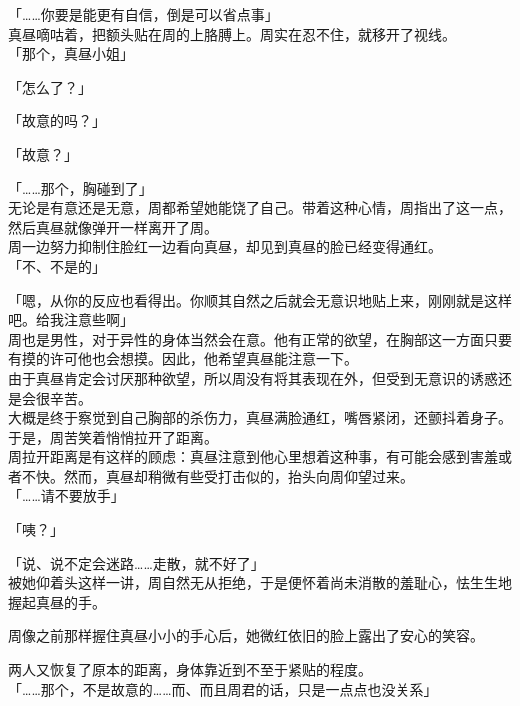 「……你要是能更有自信，倒是可以省点事」\\

真昼嘀咕着，把额头贴在周的上胳膊上。周实在忍不住，就移开了视线。\\

「那个，真昼小姐」

「怎么了？」

「故意的吗？」

「故意？」

「……那个，胸碰到了」\\

无论是有意还是无意，周都希望她能饶了自己。带着这种心情，周指出了这一点，然后真昼就像弹开一样离开了周。\\

周一边努力抑制住脸红一边看向真昼，却见到真昼的脸已经变得通红。\\

「不、不是的」

「嗯，从你的反应也看得出。你顺其自然之后就会无意识地贴上来，刚刚就是这样吧。给我注意些啊」\\

周也是男性，对于异性的身体当然会在意。他有正常的欲望，在胸部这一方面只要有摸的许可他也会想摸。因此，他希望真昼能注意一下。\\

由于真昼肯定会讨厌那种欲望，所以周没有将其表现在外，但受到无意识的诱惑还是会很辛苦。\\

大概是终于察觉到自己胸部的杀伤力，真昼满脸通红，嘴唇紧闭，还颤抖着身子。于是，周苦笑着悄悄拉开了距离。\\

周拉开距离是有这样的顾虑：真昼注意到他心里想着这种事，有可能会感到害羞或者不快。然而，真昼却稍微有些受打击似的，抬头向周仰望过来。\\

「……请不要放手」

「咦？」

「说、说不定会迷路……走散，就不好了」\\

被她仰着头这样一讲，周自然无从拒绝，于是便怀着尚未消散的羞耻心，怯生生地握起真昼的手。

周像之前那样握住真昼小小的手心后，她微红依旧的脸上露出了安心的笑容。

两人又恢复了原本的距离，身体靠近到不至于紧贴的程度。\\

「……那个，不是故意的……而、而且周君的话，只是一点点也没关系」

